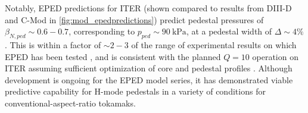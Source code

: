\noindent Notably, EPED predictions for ITER (shown compared to results from DIII-D and C-Mod \cite{Hughes2013} in \cref{fig:mod_epedpredictions}) predict pedestal pressures of $\beta_{N,ped} \sim 0.6-0.7$, corresponding to $p_{ped} \sim \SI{90}{\kilo\pascal}$, at a pedestal width of $\Delta \sim 4\%$ \cite{Snyder2009a,Snyder2011}.  This is within a factor of $\sim 2-3$ of the range of experimental results on which EPED has been tested \cite{Walk2012,Hughes2013}, and is consistent with the planned $Q=10$ operation on ITER assuming sufficient optimization of core and pedestal profiles \cite{Snyder2011,Snyder2012}.  Although development is ongoing for the EPED model series, it has demonstrated viable predictive capability for H-mode pedestals in a variety of conditions for conventional-aspect-ratio tokamaks.\nicechapterending


